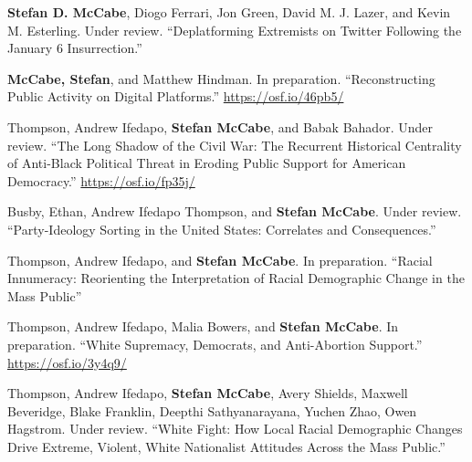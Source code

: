 \documentclass[11pt, letter]{article}
\begin{document}
\begin{hangparas}{.25in}{1}
\textbf{Stefan D. McCabe},\textsuperscript{\textdagger} Diogo Ferrari,\textsuperscript{\textdagger} Jon Green, David M. J. Lazer, and Kevin M. Esterling. Under review. ``Deplatforming Extremists on Twitter Following the January 6 Insurrection.''\vspace{2mm}

\textbf{McCabe, Stefan}, and Matthew Hindman. In preparation. ``Reconstructing Public Activity on Digital Platforms.'' \href{https://osf.io/46pb5/}{https://osf.io/46pb5/} \vspace{2mm}

Thompson, Andrew Ifedapo, \textbf{Stefan McCabe}, and Babak Bahador. Under review. ``The Long Shadow of the Civil War: The Recurrent Historical Centrality of Anti-Black Political Threat in Eroding Public Support for American Democracy.'' \href{https://osf.io/fp35j/}{https://osf.io/fp35j/} \vspace{2mm}

Busby, Ethan, Andrew Ifedapo Thompson, and \textbf{Stefan McCabe}. Under review. ``Party-Ideology Sorting in the United States: Correlates and Consequences.'' \vspace{2mm}

Thompson, Andrew Ifedapo, and \textbf{Stefan McCabe}. In preparation. ``Racial Innumeracy: Reorienting the Interpretation of Racial Demographic Change in the Mass Public''  \vspace{2mm}

Thompson, Andrew Ifedapo, Malia Bowers, and \textbf{Stefan McCabe}. In preparation. ``White Supremacy, Democrats, and Anti-Abortion Support.'' \href{https://osf.io/3y4q9/}{https://osf.io/3y4q9/} \vspace{2mm}

Thompson, Andrew Ifedapo, \textbf{Stefan McCabe}, Avery Shields, Maxwell Beveridge, Blake Franklin, Deepthi Sathyanarayana, Yuchen Zhao, Owen Hagstrom. Under review. ``White Fight: How Local Racial Demographic Changes Drive Extreme, Violent, White Nationalist Attitudes Across the Mass Public.''  \vspace{2mm}







\end{hangparas}
\end{document}
